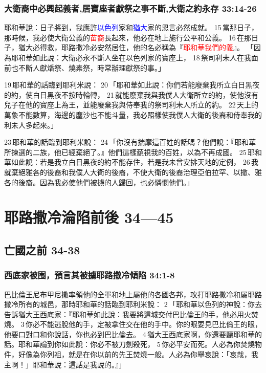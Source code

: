 \subsubsection{大衛裔中必興起義者,居寶座者獻祭之事不斷,大衛之約永存 33:14-26}
耶和華說：日子將到，我應許\textcolor{blue}{以色列}家和\textcolor{blue}{猶大}家的恩言必然成就。 15 當那日子，那時候，我必使大衛公義的\textcolor{red}{苗裔}長起來，他必在地上施行公平和公義。 16 在那日子，猶大必得救，耶路撒冷必安然居住，他的名必稱為『\textcolor{red}{耶和華我們的義}』。
「因為耶和華如此說：大衛必永不斷人坐在以色列家的寶座上， 18 祭司利未人在我面前也不斷人獻燔祭、燒素祭，時常辦理獻祭的事。」

19 耶和華的話臨到耶利米說： 20 「耶和華如此說：你們若能廢棄我所立白日黑夜的約，使白日黑夜不按時輪轉， 21 就能廢棄我與我僕人大衛所立的約，使他沒有兒子在他的寶座上為王，並能廢棄我與侍奉我的祭司利未人所立的約。 22 天上的萬象不能數算，海邊的塵沙也不能斗量，我必照樣使我僕人大衛的後裔和侍奉我的利未人多起來。」

23 耶和華的話臨到耶利米說： 24 「你沒有揣摩這百姓的話嗎？他們說：『耶和華所揀選的二族，他已經棄絕了。』他們這樣藐視我的百姓，以為不再成國。 25 耶和華如此說：若是我立白日黑夜的約不能存住，若是我未曾安排天地的定例， 26 我就棄絕雅各的後裔和我僕人大衛的後裔，不使大衛的後裔治理亞伯拉罕、以撒、雅各的後裔。因為我必使他們被擄的人歸回，也必憐憫他們。」


\section{耶路撒冷淪陷前後 34—45}
\subsection{亡國之前 34-38}
\subsubsection{西底家被围，預言其被擄耶路撒冷傾陷 34:1-8}
巴比倫王尼布甲尼撒率領他的全軍和地上屬他的各國各邦，攻打耶路撒冷和屬耶路撒冷所有的城邑，那時耶和華的話臨到耶利米說： 2 「耶和華以色列的神說：你去告訴猶大王西底家：『耶和華如此說：我要將這城交付巴比倫王的手，他必用火焚燒。 3 你必不能逃脫他的手，定被拿住交在他的手中。你的眼要見巴比倫王的眼，他要口對口和你說話，你也必到巴比倫去。 4 猶大王西底家啊，你還要聽耶和華的話。耶和華論到你如此說：你必不被刀劍殺死， 5 你必平安而死。人必為你焚燒物件，好像為你列祖，就是在你以前的先王焚燒一般。人必為你舉哀說：「哀哉，我主啊！」耶和華說：這話是我說的。』」


